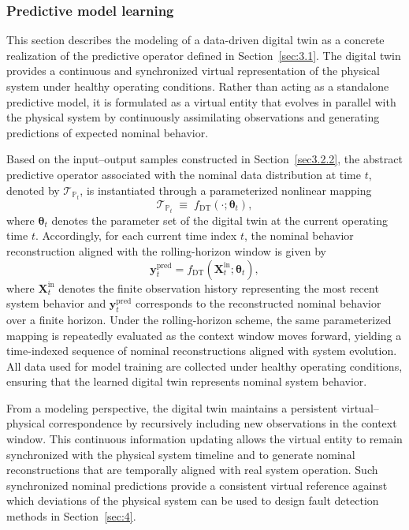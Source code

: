 \documentclass[a4paper,10pt]{cas-sc}%
\begin{document}
\subsubsection{Predictive model learning}\label{sec:3.2.3}

This section describes the modeling of a data-driven digital twin as a concrete realization of the predictive operator defined in Section~\ref{sec:3.1}. The digital twin provides a continuous and synchronized virtual representation of the physical system under healthy operating conditions. Rather than acting as a standalone predictive model, it is formulated as a virtual entity that evolves in parallel with the physical system by continuously assimilating observations and generating predictions of expected nominal behavior.

Based on the input--output samples constructed in Section~\ref{sec3.2.2}, the abstract predictive operator associated with the nominal data distribution at time $t$, denoted by $\mathcal{T}_{\mathbb{P}_t}$, is instantiated through a parameterized nonlinear mapping
\begin{equation}
	\mathcal{T}_{\mathbb{P}_t}
	\;\equiv\;
	f_{\mathrm{DT}}(\cdot;\boldsymbol{\theta}_t),
\end{equation}
where $\boldsymbol{\theta}_t$ denotes the parameter set of the digital twin at the current operating time $t$. Accordingly, for each current time index $t$, the nominal behavior reconstruction aligned with the rolling-horizon window is given by
\begin{equation}
	\boldsymbol{y}_t^{\mathrm{pred}}
	=
	f_{\mathrm{DT}}\!\left( \boldsymbol{X}_t^{\mathrm{in}};\boldsymbol{\theta}_t \right),
\end{equation}
where $\boldsymbol{X}_t^{\mathrm{in}}$ denotes the finite observation history representing the most recent system behavior and $\boldsymbol{y}_t^{\mathrm{pred}}$ corresponds to the reconstructed nominal behavior over a finite horizon. Under the rolling-horizon scheme, the same parameterized mapping is repeatedly evaluated as the context window moves forward, yielding a time-indexed sequence of nominal reconstructions aligned with system evolution. All data used for model training are collected under healthy operating conditions, ensuring that the learned digital twin represents nominal system behavior.

From a modeling perspective, the digital twin maintains a persistent virtual--physical correspondence by recursively including new observations in the context window. This continuous information updating allows the virtual entity to remain synchronized with the physical system timeline and to generate nominal reconstructions that are temporally aligned with real system operation. Such synchronized nominal predictions provide a consistent virtual reference against which deviations of the physical system can be used to design fault detection methods in Section~\ref{sec:4}.
\end{document}
